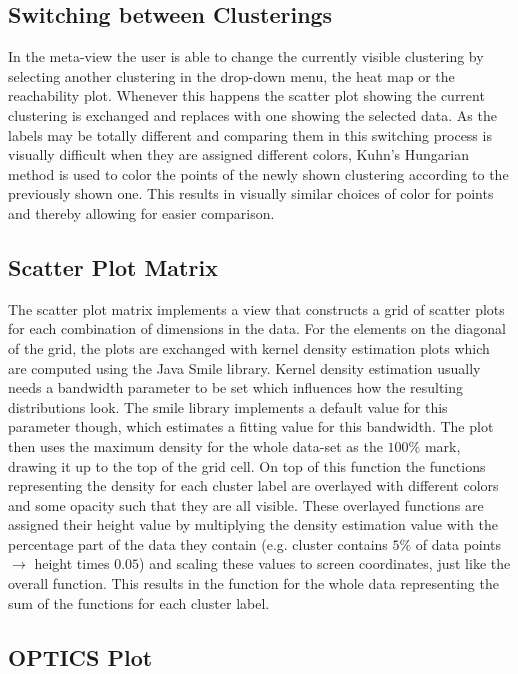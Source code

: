 \documentclass[
	a4paper,
	english,
	twoside,
	openright,               
	11pt                            
	]{report}
\begin{document}
\subsection{Switching between Clusterings}

In the meta-view the user is able to change the currently visible clustering by selecting another clustering in the drop-down menu, the heat map or the reachability plot. Whenever this happens the scatter plot showing the current clustering is exchanged and replaces with one showing the selected data. As the labels may be totally different and comparing them in this switching process is visually difficult when they are assigned different colors, Kuhn’s Hungarian method \cite{Kuhn2010} is used to color the points of the newly shown clustering according to the previously shown one. This results in visually similar choices of color for points and thereby allowing for easier comparison.

\subsection{Scatter Plot Matrix}

The scatter plot matrix implements a view that constructs a grid of scatter plots for each combination of dimensions in the data. For the elements on the diagonal of the grid, the plots are exchanged with kernel density estimation plots which are computed using the Java Smile \cite{javasmile} library. Kernel density estimation usually needs a bandwidth parameter to be set which influences how the resulting distributions look. The smile library implements a default value for this parameter though, which estimates a fitting value for this bandwidth. The plot then uses the maximum density for the whole data-set as the $100\% $ mark, drawing it up to the top of the grid cell. On top of this function the functions representing the density for each cluster label are overlayed with different colors and some opacity such that they are all visible. These overlayed functions are assigned their height value by multiplying the density estimation value with the percentage part of the data they contain (e.g. cluster contains $5\% $ of data points $\rightarrow$ height times $0.05$) and scaling these values to screen coordinates, just like the overall function. This results in the function for the whole data representing the sum of the functions for each cluster label.

\subsection{OPTICS Plot}
\end{document}
